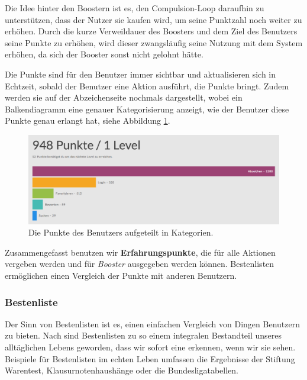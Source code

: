 \documentclass[12pt,twoside]{book}
\begin{document}
Die Idee hinter den Boostern ist es, den Compulsion-Loop daraufhin zu unterstützen, dass der Nutzer sie kaufen wird, um seine Punktzahl noch weiter zu erhöhen. Durch die kurze Verweildauer des Boosters und dem Ziel des Benutzers seine Punkte zu erhöhen, wird dieser zwangsläufig seine Nutzung mit dem System erhöhen, da sich der Booster sonst nicht gelohnt hätte.

Die Punkte sind für den Benutzer immer sichtbar und aktualisieren sich in Echtzeit, sobald der Benutzer eine Aktion ausführt, die Punkte bringt. Zudem werden sie auf der Abzeichenseite nochmals dargestellt, wobei ein Balkendiagramm eine genauer Kategorisierung anzeigt, wie der Benutzer diese Punkte genau erlangt hat, siehe Abbildung \ref{fig:points}.

\begin{figure}[htbp]
    \centering
    \includegraphics[width=1.0\textwidth]{images/infoboard_userstats.png}
    \caption{Die Punkte des Benutzers aufgeteilt in Kategorien.}
    \label{fig:points}
\end{figure}

Zusammengefasst benutzen wir \textbf{Erfahrungspunkte}, die für alle Aktionen vergeben werden und für \textit{Booster} ausgegeben werden können. Bestenlisten ermöglichen einen Vergleich der Punkte mit anderen Benutzern.

\subsubsection*{Bestenliste}

Der Sinn von Bestenlisten ist es, einen einfachen Vergleich von Dingen Benutzern zu bieten. Nach \citep[pp. 49 - 50]{zichermann2011gamification} sind Bestenlisten zu so einem integralen Bestandteil unseres alltäglichen Lebens geworden, dass wir sofort eine erkennen, wenn wir sie sehen. Beispiele für Bestenlisten im echten Leben umfassen die Ergebnisse der Stiftung Warentest, Klausurnotenhaushänge oder die Bundesligatabellen.
\end{document}
